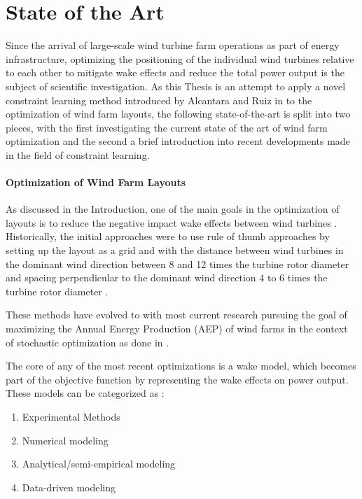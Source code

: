 
\chapter{State of the Art}\label{chapter:state_of_the_art}

Since the arrival of large-scale wind turbine farm operations as part of energy infrastructure, optimizing the positioning of the individual wind turbines relative to each other to mitigate wake effects and reduce the total power output is the subject of scientific investigation. As this Thesis is an attempt to apply a novel constraint learning method introduced by Alcantara and Ruiz in \cite{ALCANTARA2023120895} to the optimization of wind farm layouts, the following state-of-the-art is split into two pieces, with the first investigating the current state of the art of wind farm optimization and the second a brief introduction into recent developments made in the field of constraint learning. 

\subsubsection{Optimization of Wind Farm Layouts}

As discussed in the Introduction, one of the main goals in the optimization of layouts is to reduce the negative impact wake effects between wind turbines \cite{KIM2024123383}. Historically, the initial approaches were to use rule of thumb approaches by setting up the layout as a grid and with the distance between wind turbines in the dominant wind direction  between 8 and 12 times the turbine rotor diameter and spacing perpendicular to the dominant wind direction 4 to 6 times the turbine rotor diameter \cite{AZLAN2021110047} \cite{hou_review_2019}.

These methods have evolved to with most current research pursuing the goal of maximizing the Annual Energy Production (AEP) of wind farms in the context of stochastic optimization as done in \cite{Sinner_2024} \cite{KIM2024123383}. 

The core of any of the most recent optimizations is a wake model, which becomes part of the objective function by representing the wake effects on power output. These models can be categorized as \cite{WANG2024118508}: 

\begin{enumerate}
	\item Experimental Methods
	\item Numerical modeling
	\item Analytical/semi-empirical modeling
	\item Data-driven modeling
\end{enumerate}

